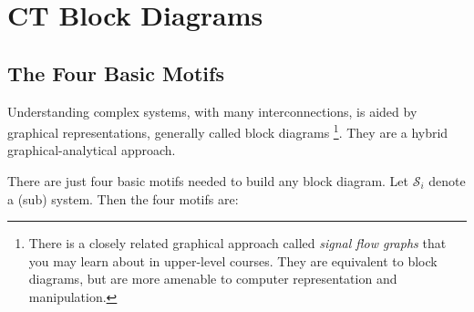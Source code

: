 \chapter{CT Block Diagrams}

\section{The Four Basic Motifs}

Understanding complex systems, with many interconnections, is aided by graphical representations, generally called block diagrams \footnote{There is a closely related graphical approach called \emph{signal flow graphs} that you may learn about in upper-level courses. They are equivalent to block diagrams, but are more amenable to computer representation and manipulation.}. They are a hybrid graphical-analytical approach.

There are just four basic motifs needed to build any block diagram. Let $\mathcal{S}_i$ denote a (sub) system. Then the four motifs are:

